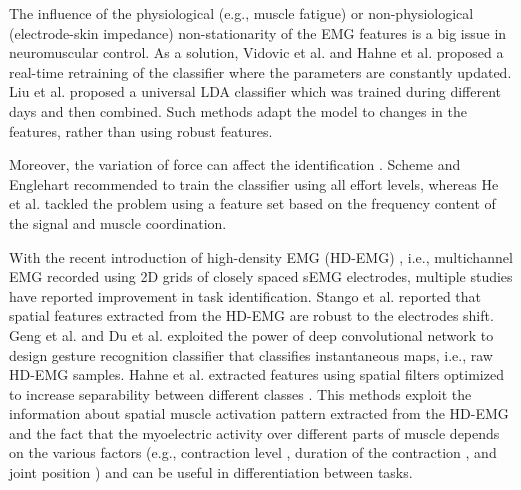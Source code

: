 The influence of the physiological (e.g., muscle fatigue) or non-physiological (electrode-skin impedance) non-stationarity of the EMG features is a big issue in neuromuscular control. As a solution, Vidovic et al. \citep{Vidovic2016} and Hahne et al. \citep{Hahne2015} proposed a real-time retraining of the classifier where the parameters are constantly updated. Liu et al. \citep{Liu2016} proposed a universal LDA classifier which was trained during different days and then combined. Such methods adapt the model to changes in the features, rather than using robust features.

Moreover, the variation of force can affect the identification \citep{Tkach2010}. Scheme and Englehart \citep{Scheme2013} recommended to train the classifier using all effort levels, whereas He et al. \citep{He2015} tackled the problem using a feature set based on the frequency content of the signal and muscle coordination.

With the recent introduction of high-density EMG (HD-EMG) \citep{Merletti2009}, i.e., multichannel EMG recorded using 2D grids of closely spaced sEMG electrodes, multiple studies have reported improvement in task identification. Stango et al. reported that spatial features extracted from the HD-EMG are robust to the electrodes shift. Geng et al. \citep{Geng2016} and Du et al. \citep{Du2017} exploited the power of deep convolutional network to design gesture recognition classifier that classifies instantaneous maps, i.e., raw HD-EMG samples. Hahne et al. extracted features using spatial filters optimized to increase separability between different classes \citep{Hahne2012}. This methods exploit the information about spatial muscle activation pattern extracted from the HD-EMG and the fact that the myoelectric activity over different parts of muscle depends on the various factors (e.g., contraction level \citep{Holtermann2005}, duration of the contraction \citep{Tucker2009}, and joint position \citep{Vieira2010}) and can be useful in differentiation between tasks.

